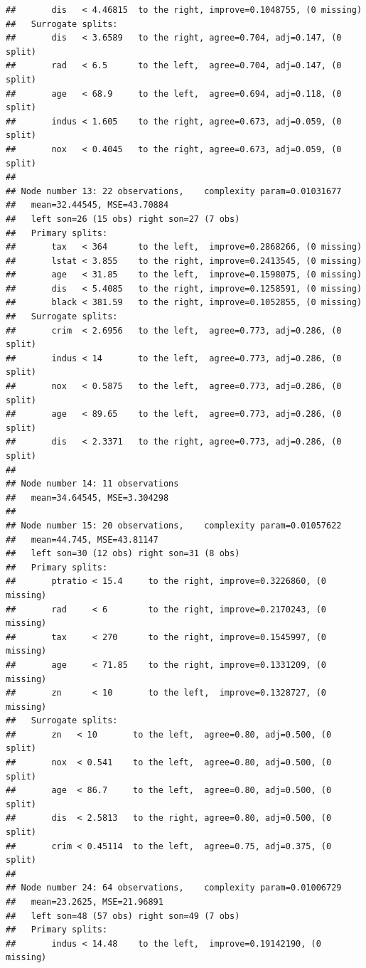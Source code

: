 \documentclass[]{book}
\theoremstyle{plain}
\theoremstyle{definition}
\theoremstyle{definition}
\theoremstyle{definition}
\theoremstyle{definition}
\theoremstyle{remark}
\begin{document}
\begin{verbatim}
##       dis   < 4.46815  to the right, improve=0.1048755, (0 missing)
##   Surrogate splits:
##       dis   < 3.6589   to the right, agree=0.704, adj=0.147, (0 split)
##       rad   < 6.5      to the left,  agree=0.704, adj=0.147, (0 split)
##       age   < 68.9     to the left,  agree=0.694, adj=0.118, (0 split)
##       indus < 1.605    to the right, agree=0.673, adj=0.059, (0 split)
##       nox   < 0.4045   to the right, agree=0.673, adj=0.059, (0 split)
## 
## Node number 13: 22 observations,    complexity param=0.01031677
##   mean=32.44545, MSE=43.70884 
##   left son=26 (15 obs) right son=27 (7 obs)
##   Primary splits:
##       tax   < 364      to the left,  improve=0.2868266, (0 missing)
##       lstat < 3.855    to the right, improve=0.2413545, (0 missing)
##       age   < 31.85    to the left,  improve=0.1598075, (0 missing)
##       dis   < 5.4085   to the right, improve=0.1258591, (0 missing)
##       black < 381.59   to the right, improve=0.1052855, (0 missing)
##   Surrogate splits:
##       crim  < 2.6956   to the left,  agree=0.773, adj=0.286, (0 split)
##       indus < 14       to the left,  agree=0.773, adj=0.286, (0 split)
##       nox   < 0.5875   to the left,  agree=0.773, adj=0.286, (0 split)
##       age   < 89.65    to the left,  agree=0.773, adj=0.286, (0 split)
##       dis   < 2.3371   to the right, agree=0.773, adj=0.286, (0 split)
## 
## Node number 14: 11 observations
##   mean=34.64545, MSE=3.304298 
## 
## Node number 15: 20 observations,    complexity param=0.01057622
##   mean=44.745, MSE=43.81147 
##   left son=30 (12 obs) right son=31 (8 obs)
##   Primary splits:
##       ptratio < 15.4     to the right, improve=0.3226860, (0 missing)
##       rad     < 6        to the right, improve=0.2170243, (0 missing)
##       tax     < 270      to the right, improve=0.1545997, (0 missing)
##       age     < 71.85    to the right, improve=0.1331209, (0 missing)
##       zn      < 10       to the left,  improve=0.1328727, (0 missing)
##   Surrogate splits:
##       zn   < 10       to the left,  agree=0.80, adj=0.500, (0 split)
##       nox  < 0.541    to the left,  agree=0.80, adj=0.500, (0 split)
##       age  < 86.7     to the left,  agree=0.80, adj=0.500, (0 split)
##       dis  < 2.5813   to the right, agree=0.80, adj=0.500, (0 split)
##       crim < 0.45114  to the left,  agree=0.75, adj=0.375, (0 split)
## 
## Node number 24: 64 observations,    complexity param=0.01006729
##   mean=23.2625, MSE=21.96891 
##   left son=48 (57 obs) right son=49 (7 obs)
##   Primary splits:
##       indus < 14.48    to the left,  improve=0.19142190, (0 missing)

\end{verbatim}
\end{document}
